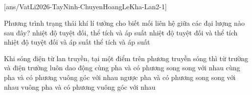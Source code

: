 \def\CheDo{solcolor}%
\def\tenchuong{THPT chuyên Hoàng Lê Kha, Tây Ninh -- Lần 2}
\def\thuonghieu{VẬT LÍ 12 -- Eduzy.com.vn}
\def\TachCauDS{1}
\def\TachCauLG{1}




	\noindent
	\subsection*{}
	\setcounter{ex}{0}
	[ans/VatLi2026-TayNinh-ChuyenHoangLeKha-Lan2-1]

	\begin{ex}%
		Phương trình trạng thái khí lí tưởng cho biết mối liên hệ giữa các đại lượng nào sau đây?
		\choice
		{\True nhiệt độ tuyệt đối, thể tích và áp suất}
		{nhiệt độ tuyệt đối và thể tích}
		{nhiệt độ tuyệt đối và áp suất}
		{thể tích và áp suất}
	\end{ex}

	\begin{ex}%
		Khi sóng điện từ lan truyền, tại một điểm trên phương truyền sóng thì từ trường và điện trường luôn dao động
		\choice
		{cùng pha và có phương song song với nhau}
		{\True cùng pha và có phương vuông góc với nhau}
		{ngược pha và có phương song song với nhau}
		{vuông pha và có phương vuông góc với nhau}
	\end{ex}

